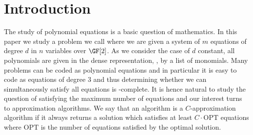 \section{Introduction}

The study of polynomial equations is a basic question
of mathematics.  In this paper we study a problem we
call 
where we are given a system of $m$ equations of degree
$d$ in $n$ variables over $\GF[2]$.  As we consider the
case of $d$ constant, all polynomials are given in
the dense representation, \ie, by a list of monomials.
Many problems can be coded as polynomial equations and in particular
it is easy to code  as equations of degree 3
and thus determining whether we can simultaneously
satisfy all equations is -complete.   It is hence
natural to study
the question of satisfying the %
maximum
number of
equations and our interest turns to approximation
algorithms.  We say that an algorithm is a $C$-approximation
algorithm if it always returns a solution which satisfies
at least $C \cdot \mbox{OPT}$ equations where
$\mbox{OPT}$ is the number of equations satisfied
by the optimal solution.  
